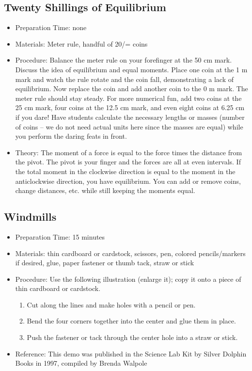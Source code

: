 \subsection{Twenty Shillings of Equilibrium}
\begin{itemize}
\item{Preparation Time: none}
\item{Materials: Meter rule, handful of 20/= coins}
\item{Procedure: Balance the meter rule on your forefinger at the 50 cm mark. Discuss the idea of equilibrium and equal moments. Place one coin at the 1 m mark and watch the rule rotate and the coin fall, demonstrating a lack of equilibrium. Now replace the coin and add another coin to the 0 m mark. The meter rule should stay steady. For more numerical fun, add two coins at the 25 cm mark, four coins at the 12.5 cm mark, and even eight coins at 6.25 cm if you dare! Have students calculate the necessary lengths or masses (number of coins – we do not need actual units here since the masses are equal) while you perform the daring feats in front.}
\item{Theory: The moment of a force is equal to the force times the distance from the pivot. The pivot is your finger and the forces are all at even intervals. If the total moment in the clockwise direction is equal to the moment in the anticlockwise direction, you have equilibrium. You can add or remove coins, change distances, etc. while still keeping the moments equal.}
\end{itemize}

\subsection{Windmills}
\begin{itemize}
\item{Preparation Time: 15 minutes}
\item{Materials: thin cardboard or cardstock, scissors, pen, colored pencils/markers if desired, glue, paper fastener or thumb tack, straw or stick}
\item{Procedure: Use the following illustration (enlarge it); copy it onto a piece of thin cardboard or cardstock.}
\begin{enumerate}
\item{Cut along the lines and make holes with a pencil or pen.}
\item{Bend the four corners together into the center and glue them in place.}
\item{Push the fastener or tack through the center hole into a straw or stick.}
\end{enumerate}
\item{Reference: This demo was published in the Science Lab Kit by Silver Dolphin Books in 1997, compiled by Brenda Walpole}
\end{itemize}

